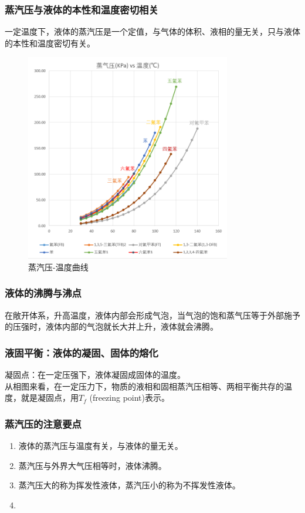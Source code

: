 \documentclass[12pt, a4paper, oneside]{ctexbook}
\begin{document}
\subsubsection*{蒸汽压与液体的本性和温度密切相关}
一定温度下，液体的蒸汽压是一个定值，与气体的体积、液相的量无关，只与液体的本性和温度密切有关。
\begin{figure}[htbp]
    \centering
    \includegraphics[width=0.8\textwidth]{vapor_pressure.png}
    \caption{蒸汽压-温度曲线}
\end{figure}

\newpage
\subsubsection{液体的沸腾与沸点}
在敞开体系，升高温度，液体内部会形成气泡，当气泡的饱和蒸气压等于外部施予的压强时，液体内部的气泡就长大并上升，液体就会沸腾。\\
\subsubsection{液固平衡：液体的凝固、固体的熔化}
凝固点：在一定压强下，液体凝固成固体的温度。\\
从相图来看，在一定压力下，物质的液相和固相蒸汽压相等、两相平衡共存的温度，就是凝固点，用$T_f$ (freezing point)表示。\\

\subsubsection{蒸汽压的注意要点}
\begin{enumerate}
    \item 液体的蒸汽压与温度有关，与液体的量无关。
    \item 蒸汽压与外界大气压相等时，液体沸腾。
    \item 蒸汽压大的称为挥发性液体，蒸汽压小的称为不挥发性液体。
    \item 
\end{enumerate}
\end{document}
